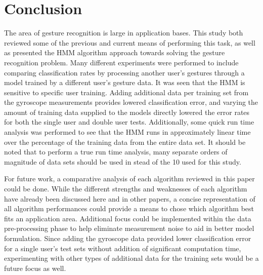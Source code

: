 \documentclass[conference]{IEEEtran}
\begin{document}
%
%    
%
%
%
%
%    
%




\section{Conclusion}

The area of gesture recognition is large in application bases. This study both reviewed some of the previous and current means of performing this task, as well as presented the HMM algorithm approach towards solving the gesture recognition problem. Many different experiments were performed to include comparing classification rates by processing another user's gestures through a model trained by a different user's gesture data. It was seen that the HMM is sensitive to specific user training. Adding additional data per training set from the gyroscope measurements provides lowered classification error, and varying the amount of training data supplied to the models directly lowered the error rates for both the single user and double user tests. Additionally, some quick run time analysis was performed to see that the HMM runs in approximately linear time over the percentage of the training data from the entire data set. It should be noted that to perform a true run time analysis, many separate orders of magnitude of data sets should be used in stead of the 10 used for this study.

For future work, a comparative analysis of each algorithm reviewed in this paper could be done. While the different strengths and weaknesses of each algorithm have already been discussed here and in other papers, a concise representation of all algorithm performances could provide a means to chose which algorithm best fits an application area. Additional focus could be implemented within the data pre-processing phase to help eliminate measurement noise to aid in better model formulation. Since adding the gyroscope data provided lower classification error for a single user's test sets without addition of significant computation time, experimenting with other types of additional data for the training sets would be a future focus as well.  
\end{document}
